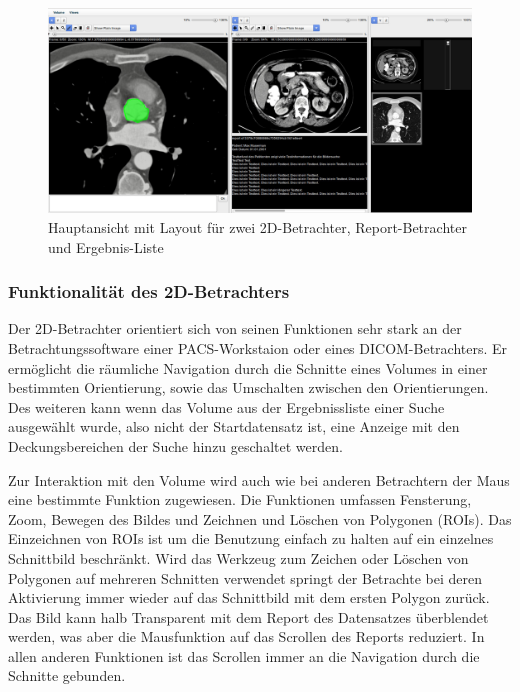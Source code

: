 \begin{figure}[t]
	\centering
		\includegraphics[width=0.8\linewidth]{img/c3_application_standard.jpg}
	\caption{Hauptansicht mit Layout für zwei 2D-Betrachter, Report-Betrachter und Ergebnis-Liste}
	\label{fig:omip_aplication_layout}
\end{figure}


\subsubsection{Funktionalität des 2D-Betrachters}
\label{sec:Funktionalität des 2D-Betrachters}
Der 2D-Betrachter orientiert sich von seinen Funktionen sehr stark an der Betrachtungssoftware einer PACS-Workstaion oder eines DICOM-Betrachters.
Er ermöglicht die räumliche Navigation durch die Schnitte eines Volumes in einer bestimmten Orientierung, sowie das Umschalten zwischen den Orientierungen.
Des weiteren kann wenn das Volume aus der Ergebnissliste einer Suche ausgewählt wurde, 
also nicht der Startdatensatz ist,
eine Anzeige mit den Deckungsbereichen der Suche hinzu geschaltet werden. 

Zur Interaktion mit den Volume wird auch wie bei anderen Betrachtern der Maus eine bestimmte Funktion zugewiesen.
Die Funktionen umfassen Fensterung, Zoom, Bewegen des Bildes und Zeichnen und Löschen von Polygonen (ROIs).
Das Einzeichnen von ROIs ist um die Benutzung einfach zu halten auf ein einzelnes Schnittbild beschränkt.
Wird das Werkzeug zum Zeichen oder Löschen von Polygonen auf mehreren Schnitten verwendet springt der Betrachte bei deren Aktivierung immer wieder auf das Schnittbild mit dem ersten Polygon zurück.
Das Bild kann halb Transparent mit dem Report des Datensatzes überblendet werden, was aber die Mausfunktion auf das Scrollen des Reports reduziert.
In allen anderen Funktionen ist das Scrollen immer an die Navigation durch die Schnitte gebunden.

